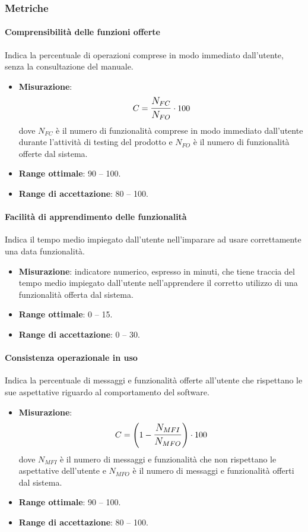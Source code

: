\subsubsection{Metriche}
\paragraph{Comprensibilità delle funzioni offerte}
Indica la percentuale di operazioni comprese in modo immediato dall'utente, senza la consultazione del manuale.
\begin{itemize}
	\item \textbf{Misurazione}: 
		$$C=\mathlarger{\frac{N_{FC}}{N_{FO}}} \cdot 100$$
	dove $N_{FC}$ è il numero di funzionalità comprese in modo immediato dall'utente durante l'attività di testing del prodotto e $N_{FO}$ è il numero di funzionalità offerte dal sistema.
	\item \textbf{Range ottimale}: 90 -- 100.
	\item \textbf{Range di accettazione}: 80 -- 100.
\end{itemize}

\paragraph{Facilità di apprendimento delle funzionalità}
Indica il tempo medio impiegato dall'utente nell'imparare ad usare correttamente una data funzionalità.
\begin{itemize}
	\item \textbf{Misurazione}: indicatore numerico, espresso in minuti, che tiene traccia del tempo medio impiegato dall'utente nell'apprendere il corretto utilizzo di una funzionalità offerta dal sistema.
	\item \textbf{Range ottimale}: 0 -- 15.
	\item \textbf{Range di accettazione}: 0 -- 30.
\end{itemize}

\paragraph{Consistenza operazionale in uso}
Indica la percentuale di messaggi e funzionalità offerte all'utente che rispettano le sue aspettative riguardo al comportamento del software.
\begin{itemize}
	\item \textbf{Misurazione}: 
		$$C=\left(1-\mathlarger{\frac{N_{MFI}}{N_{MFO}}}\right) \cdot 100$$
	dove $N_{MFI}$ è il numero di messaggi e funzionalità che non rispettano le aspettative dell'utente e $N_{MFO}$ è il numero di messaggi e funzionalità offerti dal sistema.
	\item \textbf{Range ottimale}: 90 -- 100.
	\item \textbf{Range di accettazione}: 80 -- 100.
\end{itemize}

